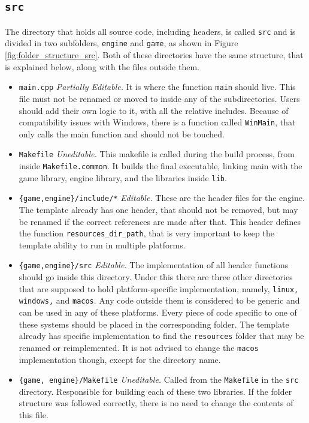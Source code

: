 \subsection{\texttt{src}}
\label{sec:src_folder}

The directory that holds all source code, including headers, is called \texttt{src} and is divided in two subfolders, \texttt{engine} and \texttt{game}, as shown in Figure \ref{fig:folder_structure_src}. Both of these directories have the same structure, that is explained below, along with the files outside them.

\begin{itemize}
	\item \texttt{main.cpp} \textit{Partially Editable.} It is where the function \texttt{main} should live. This file must not be renamed or moved to inside any of the subdirectories. Users should add their own logic to it, with all the relative includes. Because of compatibility issues with Windows, there is a function called \texttt{WinMain}, that only calls the main function and should not be touched.
	\item \texttt{Makefile} \textit{Uneditable.} This makefile is called during the build process, from inside \texttt{Makefile.common}. It builds the final executable, linking main with the game library, engine library, and the libraries inside \texttt{lib}.
	\item \texttt{\{game,engine\}/include/*} \textit{Editable.} These are the header files for the engine. The template already has one header, that should not be removed, but may be renamed if the correct references are made after that. This header defines the function \texttt{resources\_dir\_path}, that is very important to keep the template ability to run in multiple platforms.
	\item \texttt{\{game,engine\}/src} \textit{Editable.} The implementation of all header functions should go inside this directory. Under this there are three other directories that are supposed to hold platform-specific implementation, namely, \texttt{linux, windows,} and \texttt{macos}. Any code outside them is considered to be generic and can be used in any of these platforms. Every piece of code specific to one of these systems should be placed in the corresponding folder. The template already has specific implementation to find the \texttt{resources} folder that may be renamed or reimplemented. It is not advised to change the \texttt{macos} implementation though, except for the directory name.
	\item \texttt{\{game, engine\}/Makefile} \textit{Uneditable.} Called from the \texttt{Makefile} in the \texttt{src} directory. Responsible for building each of these two libraries. If the folder structure was followed correctly, there is no need to change the contents of this file.
\end{itemize}


